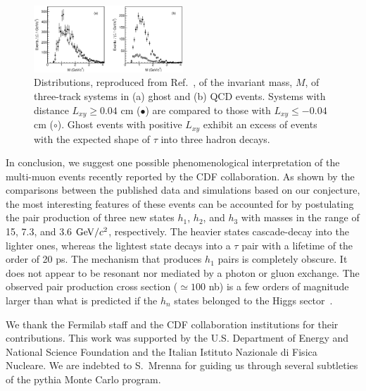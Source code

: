\documentclass[twocolumn,10pt,prl,preprint,floatfix,nofootinbib,superscriptaddress,showpacs,amssymb]{revtex4}
\begin{document}
 \begin{figure}
 \begin{center}
 \vspace{-0.3in}
 \leavevmode
 \includegraphics*[width=0.5\textwidth]{fa0_38.eps}
 \caption[]{Distributions,  reproduced from Ref.~\cite{a0disc},
            of the invariant mass, $M$, of three-track systems
            in (a) ghost and (b) QCD events. Systems with distance 
            $L_{xy} \geq 0.04$ cm ($\bullet$) are compared to those with 
            $L_{xy} \leq -0.04$ cm ($\circ$). Ghost events with positive 
            $L_{xy}$ exhibit an excess of events with the expected shape
            of  $\tau$ into three hadron decays.}
 \label{fig:fig_38}
 \end{center}
 \end{figure}

 In conclusion, we suggest one possible phenomenological interpretation
 of the  multi-muon events recently
 reported by the CDF collaboration. As shown by the comparisons between
 the published data and simulations based on our conjecture, the most interesting 
 features of these events can be accounted for by postulating the pair
 production of three new states $h_1$, $h_2$, and $h_3$ with masses in
 the range of 15, 7.3, and 3.6 ${\rm GeV/}c^2$, respectively. The heavier states 
 cascade-decay into the lighter ones, whereas the lightest state decays
 into a $\tau$ pair with a lifetime of the order of 20 ps. The mechanism
 that produces $h_1$ pairs is completely obscure. It does not appear to
 be resonant nor mediated by a photon or gluon exchange.
 The observed pair production cross section ($\simeq 100$ nb) is a 
 few orders of magnitude larger
 than what is predicted if the $h_n$ states belonged 
 to the Higgs sector~\cite{gunion,hidval}.

 We thank the Fermilab staff and the CDF collaboration institutions for
 their contributions. This work was supported by the U.S. Department
 of Energy and National Science Foundation and the Italian Istituto
 Nazionale di Fisica Nucleare. We are indebted to S.~Mrenna for guiding
 us through several subtleties of the {\sc pythia} Monte Carlo program.
 
 
\end{document}
